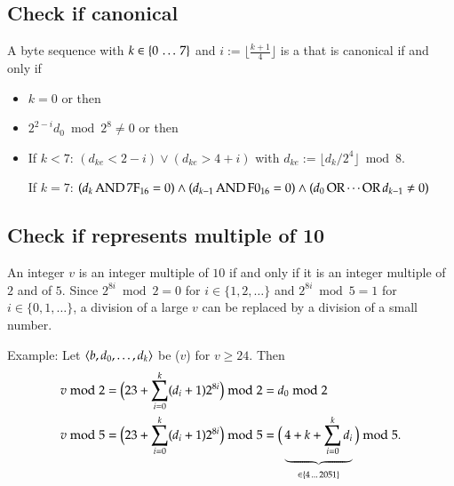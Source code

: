 \subsection{Check if canonical \DborBinaryRationalValue}
\label{sec:implementation:BinaryRationalValue:canonical}

A byte sequence  with
$k \in \{0 \,\ldots\, 7\}$ and $i := \lfloor \frac{k + 1}{4} \rfloor$
is a \DborBinaryRationalValue{} that is canonical if and only if
\begin{itemize}
    \item
    $k = 0$ or then

    \item
    $2^{2 - i} d_0 \bmod 2^8 \ne 0$ or then

    \item
    If $k < 7$:
    $(d_{ke} < 2 - i) \vee (d_{ke} > 4 + i)$
    with $d_{ke} := \lfloor d_k / 2^4 \rfloor \bmod 8$.

    If $k = 7$:
    $(d_k \operatorname{AND} \mathrm{7F}_{16} = 0) \wedge (d_{k - 1} \operatorname{AND} \mathrm{F0}_{16} = 0)
    \wedge (d_0 \operatorname{OR} \cdots \operatorname{OR} d_{k - 1} \ne 0)$
\end{itemize}


\subsection{Check if \DborIntegerValue{} represents multiple of 10}
\label{sec:implementation:IntegerValue:mod10}

An integer $v$ is an integer multiple of $10$ if and only if it is an integer multiple
of $2$ and of $5$.
Since $2^{8i} \bmod 2 = 0$ for $i \in \{1, 2, \ldots\}$
and $2^{8i} \bmod 5 = 1$ for $i \in \{0, 1, \ldots\}$,
a division of a large $v$ can be replaced by a division of a small number.

Example:
Let $\langle  b, d_0, \ldots, d_k \rangle$ be \DborIntegerValue($v$) for $v \ge 24$.
Then
\begin{align*}
    v \bmod 2
        & = \big(23 + \sum_{i = 0}^k (d_i + 1) 2^{8 i}\big) \bmod 2
        = d_0 \bmod 2 \\
    v \bmod 5
        & = \big(23 + \sum_{i = 0}^k (d_i + 1) 2^{8 i}\big) \bmod 5
        = \big(\underbrace{4 + k + \sum_{i = 0}^k d_i}_{\in \{4 \,\ldots\, 2051\}}\big) \bmod 5.
\end{align*}
